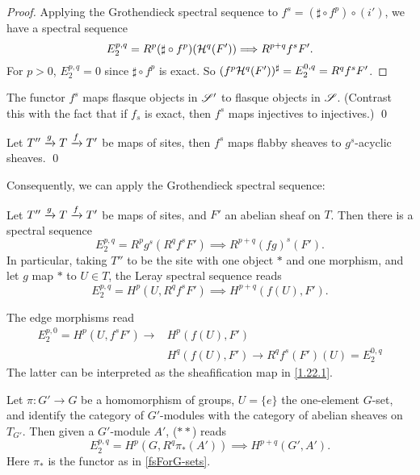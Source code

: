 \documentclass[11pt]{amsart}
\begin{document}
\begin{proof}
    Applying the Grothendieck spectral sequence to $f^s = (\sharp\circ f^p)\circ (i')$, we have a spectral sequence
    \[E_2^{p,q} = R^p(\sharp\circ f^p)(\mathcal{H}^q(F')) \Longrightarrow R^{p+q}f^sF'.\]
    For $p > 0$, $E_2^{p,q} = 0$ since $\sharp\circ f^p$ is exact. So $(f^p\mathcal{H}^q(F'))^\sharp = E_2^{0,q} = R^qf^sF'$.
\end{proof}


\begin{prop}
    The functor $f^s$ maps flasque objects in $\mathscr{S}'$ to flasque objects in $\mathscr{S}$. (Contrast this with the fact that if $f_s$ is exact, then $f^s$ maps injectives to injectives.) \qed
\end{prop}


\begin{cor}
    Let $T''\xrightarrow{g} T \xrightarrow{f} T'$ be maps of sites, then $f^s$ maps flabby sheaves to $g^s$-acyclic sheaves. \qed
\end{cor}

Consequently, we can apply the Grothendieck spectral sequence:

\begin{thm}
    Let $T''\xrightarrow{g} T \xrightarrow{f} T'$ be maps of sites, and $F'$ an abelian sheaf on $T$. Then there is a spectral sequence
    \[E_2^{p,q} = R^pg^s(R^qf^sF') \implies R^{p+q}(fg)^s(F'). \tag{$\ast$}\]
    In particular, taking $T''$ to be the site with one object $\ast$ and one morphism, and let $g$ map $\ast$ to $U\in T$, the Leray spectral sequence reads
    \[E_2^{p,q} = H^p(U, R^qf^sF') \implies H^{p+q}(f(U), F'). \tag{$\ast\ast$}\]
\end{thm}

The edge morphisms read
\begin{align*}
E_2^{p,0} = H^p(U, f^sF') \to &H^p(f(U), F')\\
&H^q(f(U), F') \to R^qf^s(F')(U) = E_2^{0,q}
\end{align*}
The latter can be interpreted as the sheafification map in \ref{1.22.1}. 

\begin{exm}
    Let $\pi:G'\to G$ be a homomorphism of groups, $U = \{e\}$ the one-element $G$-set, and identify the category of $G'$-modules with the category of abelian sheaves on $T_{G'}$. Then given a $G'$-module $A'$, ($\ast\ast$)  reads
    \[E_2^{p,q} = H^p(G, R^q\pi_\ast (A')) \implies H^{p+q}(G', A').\]
    Here $\pi_\ast$ is the functor as in \ref{fsForG-sets}.
\end{exm}
\end{document}
